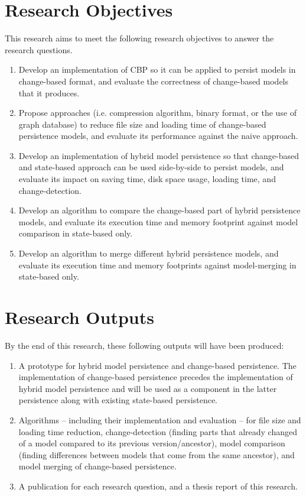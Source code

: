 \documentclass[12pt, a4paper]{report} \usepackage[titletoc]{appendix}
\begin{document}
\section{Research Objectives}
\label{sec:research_objectives}
This research aims to meet the following research objectives to answer the research questions.
\begin{enumerate}
	\item Develop an implementation of CBP so it can be applied to persist models in change-based format, and evaluate the correctness of change-based models that it produces. 
	\item Propose approaches (i.e. compression algorithm, binary format, or the use of graph database) to reduce file size and loading time of change-based persistence models, and evaluate its performance against the naive approach. 
	\item Develop an implementation of hybrid model persistence so that change-based and state-based approach can be used side-by-side to persist models, and evaluate its impact on saving time, disk space usage, loading time, and change-detection.
	\item Develop an algorithm to compare the change-based part of hybrid persistence models, and evaluate its execution time and memory footprint against model comparison in state-based only.
	\item Develop an algorithm to merge different hybrid persistence models, and evaluate its execution time and memory footprints against model-merging in state-based only. 
\end{enumerate}

\section{Research Outputs}
\label{sec:research_outputs}
By the end of this research, these following outputs will have been produced:
\begin{enumerate}
	\item A prototype for hybrid model persistence and change-based persistence. The implementation of change-based persistence precedes the implementation of hybrid model persistence and will be used as a component in the latter persistence along with existing state-based persistence. 
	\item Algorithms -- including their implementation and evaluation -- for file size and loading time reduction, change-detection (finding parts that already changed of a model compared to its previous version/ancestor), model comparison (finding differences between models that come from the same ancestor), and model merging of change-based persistence.
	\item A publication for each research question, and a thesis report of this research. 
\end{enumerate}
\end{document}
